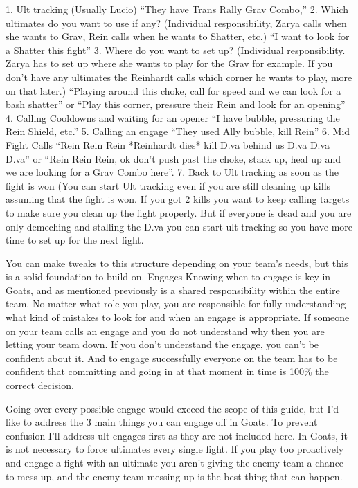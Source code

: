 1. Ult tracking (Usually Lucio)
    “They have Trans Rally Grav Combo,”
2. Which ultimates do you want to use if any? (Individual responsibility, Zarya calls when she wants to Grav, Rein calls when he wants to Shatter, etc.)
    “I want to look for a Shatter this fight”
3. Where do you want to set up? (Individual responsibility. Zarya has to set up where she wants to play for the Grav for example. If you don’t have any ultimates the Reinhardt calls which corner he wants to play, more on that later.)
    “Playing around this choke, call for speed and we can look for a bash shatter” or “Play this corner, pressure their Rein and look for an opening”
4. Calling Cooldowns and waiting for an opener
    “I have bubble, pressuring the Rein Shield, etc.”
5. Calling an engage
    “They used Ally bubble, kill Rein”
6. Mid Fight Calls
    “Rein Rein Rein *Reinhardt dies* kill D.va behind us D.va D.va D.va” or “Rein Rein Rein, ok don’t push past the choke, stack up, heal up and we are looking for a Grav Combo here”.
7. Back to Ult tracking as soon as the fight is won (You can start Ult tracking even if you are still cleaning up kills assuming that the fight is won. If you got 2 kills you want to keep calling targets to make sure you clean up the fight properly.
But if everyone is dead and you are only demeching and stalling the D.va you can start ult tracking so you have more time to set up for the next fight.

You can make tweaks to this structure depending on your team's needs, but this is a solid foundation to build on.
Engages
Knowing when to engage is key in Goats, and as mentioned previously is a shared responsibility within the entire team. No matter what role you play, you are responsible for fully understanding what kind of mistakes to look for and when an engage is appropriate. If someone on your team calls an engage and you do not understand why then you are letting your team down. If you don’t understand the engage, you can’t be confident about it. And to engage successfully everyone on the team has to be confident that committing and going in at that moment in time is 100\% the correct decision.

Going over every possible engage would exceed the scope of this guide, but I’d like to address the 3 main things you can engage off in Goats. To prevent confusion I’ll address ult engages first as they are not included here. In Goats, it is not necessary to force ultimates every single fight. If you play too proactively and engage a fight with an ultimate you aren’t giving the enemy team a chance to mess up, and the enemy team messing up is the best thing that can happen.

